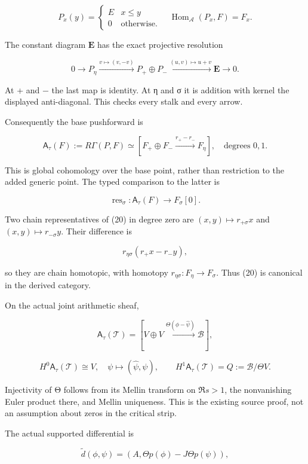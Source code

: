 \[
P_x(y)=\begin{cases}E&x\le y\\0&\text{otherwise}.\end{cases}
\quad
\operatorname{Hom}_{\mathcal A}(P_x,F)=F_x.
\tag{17}
\]

The constant diagram \(\mathbf E\) has the exact projective resolution

\[
0\longrightarrow P_\eta
\xrightarrow{v\mapsto(v,-v)}P_+\oplus P_-
\xrightarrow{(u,v)\mapsto u+v}\mathbf E\longrightarrow0.
\tag{18}
\]

At + and − the last map is identity. At η and σ it is addition with kernel the displayed anti-diagonal. This checks every stalk and every arrow.

Consequently the base pushforward is

\[
\mathsf A_\tau(F):=R\Gamma(P,F)
\simeq[F_+\oplus F_-\xrightarrow{r_+-r_-}F_\eta],
\quad\text{degrees }0,1.
\tag{19}
\]

This is global cohomology over the base point, rather than restriction to the added generic point. The typed comparison to the latter is

\[
\operatorname{res}_\sigma:\mathsf A_\tau(F)\longrightarrow F_\sigma[0].
\tag{20}
\]

Two chain representatives of (20) in degree zero are \((x,y)\mapsto r_{+\sigma}x\) and \((x,y)\mapsto r_{-\sigma}y\). Their difference is

\[
r_{\eta\sigma}(r_+x-r_-y),
\]

so they are chain homotopic, with homotopy \(r_{\eta\sigma}:F_\eta\to F_\sigma\). Thus (20) is canonical in the derived category.

On the actual joint arithmetic sheaf,

\[
\mathsf A_\tau(\mathcal T)
=[V\oplus V\xrightarrow{\Theta(\phi-\widehat\psi)}\mathscr B],
\tag{21}
\]

\[
H^0\mathsf A_\tau(\mathcal T)\cong V,
\quad \psi\mapsto(\widehat\psi,\psi),
\qquad
H^1\mathsf A_\tau(\mathcal T)=Q:=\mathscr B/\Theta V.
\tag{22}
\]

Injectivity of Θ follows from its Mellin transform on \(\Re s>1\), the nonvanishing Euler product there, and Mellin uniqueness. This is the existing source proof, not an assumption about zeros in the critical strip.

The actual supported differential is

\[
\widetilde d(\phi,\psi)
=(A,\Theta p(\phi)-J\Theta p(\psi)),
\tag{23}
\]


